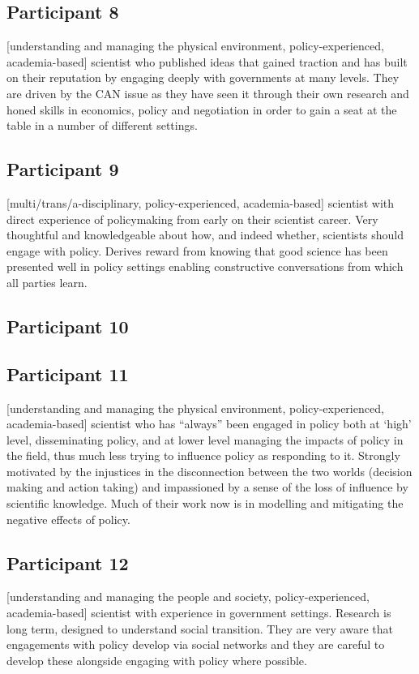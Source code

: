 \subsection{Participant 8}\label{sec:p8}
[understanding and managing the physical environment, policy-experienced, academia-based] scientist who published ideas that gained traction and has built on their reputation by engaging deeply with governments at many levels. They are driven by the  CAN issue as they have seen it through their own research and honed skills in economics, policy and negotiation in order to gain a seat at the table in a number of different settings.

\subsection{Participant 9}\label{sec:p9}
[multi/trans/a-disciplinary, policy-experienced, academia-based] scientist with direct experience of policymaking from early on their scientist career. Very thoughtful and knowledgeable about how, and indeed whether, scientists should engage with policy. Derives reward from knowing that good science has been presented well in policy settings enabling constructive conversations from which all parties learn.

\subsection{Participant 10}\label{sec:p10}


\subsection{Participant 11}\label{sec:p11}
[understanding and managing the physical environment, policy-experienced, academia-based] scientist who has ``always'' been engaged in policy both at `high' level, disseminating policy, and at lower level managing the impacts of policy in the field, thus much less trying to influence policy as responding to it. Strongly motivated by the injustices in the disconnection between the two worlds (decision making and action taking) and impassioned by a sense of the loss of influence by scientific knowledge. Much of their work now is in modelling and mitigating the negative effects of policy. 

\subsection{Participant 12}\label{sec:p12}
[understanding and managing the people and society, policy-experienced, academia-based] scientist with experience in government settings. Research is long term, designed to understand social transition. They are very aware that engagements with policy develop via social networks and they are careful to develop these alongside engaging with policy where possible. 

